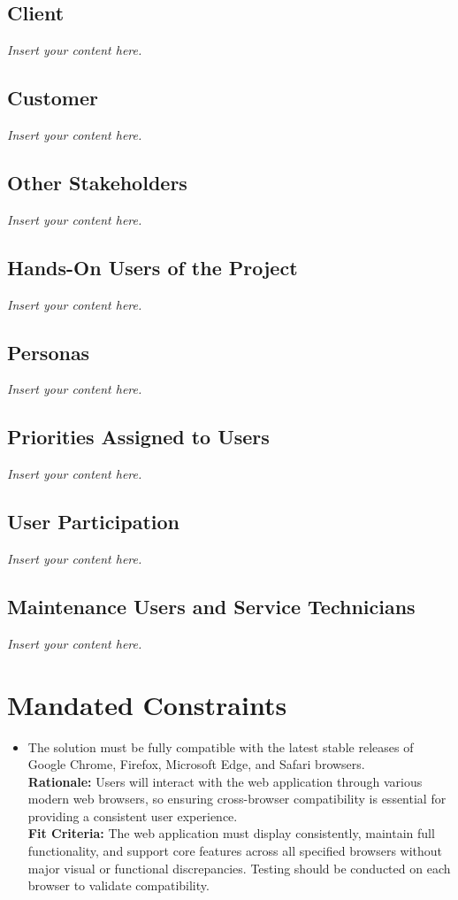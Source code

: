 \documentclass[12pt]{article}
\newcommand{\lips}{\textit{Insert your content here.}}
\begin{document}
\subsection{Client}
\lips
\subsection{Customer}
\lips
\subsection{Other Stakeholders}
\lips
\subsection{Hands-On Users of the Project}
\lips
\subsection{Personas}
\lips
\subsection{Priorities Assigned to Users}
\lips
\subsection{User Participation}
\lips
\subsection{Maintenance Users and Service Technicians}
\lips

\section{Mandated Constraints}
\begin{itemize}
  \item The solution must be fully compatible with the latest stable releases of Google Chrome, Firefox, Microsoft Edge, and Safari browsers.\\ \textbf{Rationale:} Users will interact with the web application through various modern web browsers, so ensuring cross-browser compatibility is essential for providing a consistent user experience. \\ \textbf{Fit Criteria:} The web application must display consistently, maintain full functionality, and support core features across all specified browsers without major visual or functional discrepancies. Testing should be conducted on each browser to validate compatibility.
\end{itemize}
\end{document}
